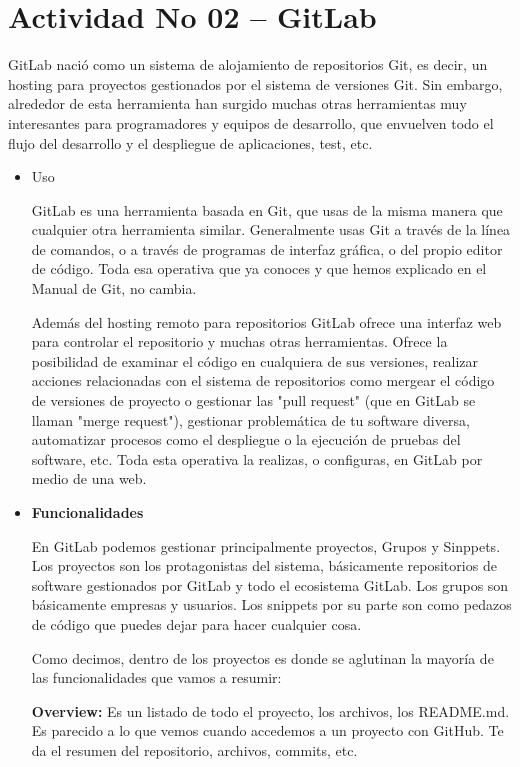 \section{Actividad No 02 – GitLab} 
GitLab nació como un sistema de alojamiento de repositorios Git, es decir, un hosting para proyectos gestionados por el sistema de versiones Git. Sin embargo, alrededor de esta herramienta han surgido muchas otras herramientas muy interesantes para programadores y equipos de desarrollo, que envuelven todo el flujo del desarrollo y el despliegue de aplicaciones, test, etc.
\begin{itemize}

	\item Uso

	GitLab es una herramienta basada en Git, que usas de la misma manera que cualquier otra herramienta similar. Generalmente usas Git a través de la línea de comandos, o a través de programas de interfaz gráfica, o del propio editor de código. Toda esa operativa que ya conoces y que hemos explicado en el Manual de Git, no cambia.

Además del hosting remoto para repositorios GitLab ofrece una interfaz web para controlar el repositorio y muchas otras herramientas. Ofrece la posibilidad de examinar el código en cualquiera de sus versiones, realizar acciones relacionadas con el sistema de repositorios como mergear el código de versiones de proyecto o gestionar las "pull request" (que en GitLab se llaman "merge request"), gestionar problemática de tu software diversa, automatizar procesos como el despliegue o la ejecución de pruebas del software, etc. Toda esta operativa la realizas, o configuras, en GitLab por medio de una web.

	

           \item\textbf{ Funcionalidades}
    
	En GitLab podemos gestionar principalmente proyectos, Grupos y Sinppets. Los proyectos son los protagonistas del sistema, básicamente repositorios de software gestionados por GitLab y todo el ecosistema GitLab. Los grupos son básicamente empresas y usuarios. Los snippets por su parte son como pedazos de código que puedes dejar para hacer cualquier cosa.

Como decimos, dentro de los proyectos es donde se aglutinan la mayoría de las funcionalidades que vamos a resumir:

          \textbf {Overview:}
           Es un listado de todo el proyecto, los archivos, los README.md. Es parecido a lo que vemos cuando accedemos a un proyecto con GitHub. Te da el resumen del repositorio, archivos, commits, etc.


\end{itemize}
